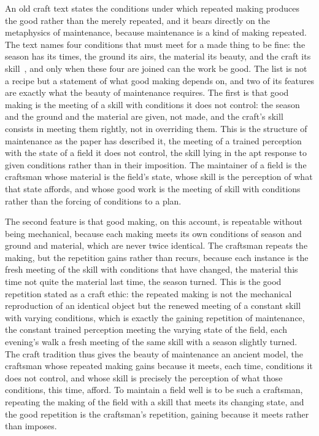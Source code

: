 An old craft text states the conditions under which repeated making produces the good rather than the merely repeated, and it bears directly on the metaphysics of maintenance, because maintenance is a kind of making repeated. The text names four conditions that must meet for a made thing to be fine: the season has its times, the ground its airs, the material its beauty, and the craft its skill~\parencite{kaogongji}, and only when these four are joined can the work be good. The list is not a recipe but a statement of what good making depends on, and two of its features are exactly what the beauty of maintenance requires. The first is that good making is the meeting of a skill with conditions it does not control: the season and the ground and the material are given, not made, and the craft's skill consists in meeting them rightly, not in overriding them. This is the structure of maintenance as the paper has described it, the meeting of a trained perception with the state of a field it does not control, the skill lying in the apt response to given conditions rather than in their imposition. The maintainer of a field is the craftsman whose material is the field's state, whose skill is the perception of what that state affords, and whose good work is the meeting of skill with conditions rather than the forcing of conditions to a plan.

The second feature is that good making, on this account, is repeatable without being mechanical, because each making meets its own conditions of season and ground and material, which are never twice identical. The craftsman repeats the making, but the repetition gains rather than recurs, because each instance is the fresh meeting of the skill with conditions that have changed, the material this time not quite the material last time, the season turned. This is the good repetition stated as a craft ethic: the repeated making is not the mechanical reproduction of an identical object but the renewed meeting of a constant skill with varying conditions, which is exactly the gaining repetition of maintenance, the constant trained perception meeting the varying state of the field, each evening's walk a fresh meeting of the same skill with a season slightly turned. The craft tradition thus gives the beauty of maintenance an ancient model, the craftsman whose repeated making gains because it meets, each time, conditions it does not control, and whose skill is precisely the perception of what those conditions, this time, afford. To maintain a field well is to be such a craftsman, repeating the making of the field with a skill that meets its changing state, and the good repetition is the craftsman's repetition, gaining because it meets rather than imposes.


